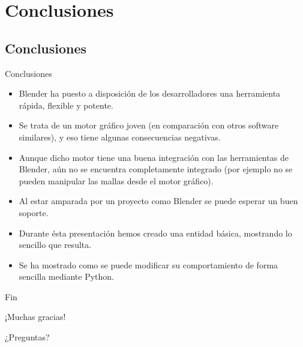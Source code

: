 \section{Conclusiones} 

\subsection{Conclusiones}
\begin{frame}{Conclusiones}
\begin{itemize}
	\item Blender ha puesto a disposición de los desarrolladores una herramienta
	rápida, flexible y potente. \pause
	\item Se trata de un motor gráfico joven (en comparación con otros software
	similares), y eso tiene algunas consecuencias negativas. \pause
	\item Aunque dicho motor tiene una buena integración con las herramientas de
	Blender, aún no se encuentra completamente integrado (por ejemplo no se pueden
	manipular las mallas desde el motor gráfico).
	\item Al estar amparada por un proyecto como Blender se puede esperar un buen
	soporte. \pause
	\item Durante ésta presentación hemos creado una entidad básica, mostrando lo
	sencillo que resulta. \pause
	\item Se ha mostrado como se puede modificar su comportamiento de forma
	sencilla mediante Python. \pause
\end{itemize}
\end{frame}

\begin{frame}{Fin}
\begin{center}
{\Huge ¡Muchas gracias!}

{\Huge ¿Preguntas?}
\end{center}
\end{frame}
